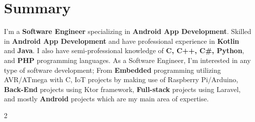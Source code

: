 

\textcolor{darkgray}{\noindent\makebox[\linewidth]{\rule{\maxdimen}{2pt}}}


\section*{\LARGE{Summary}}
I'm a \textbf{Software Engineer} specializing in \textbf{Android App Development}.
Skilled in \textbf{Android App Development} and have professional experience in \textbf{Kotlin} and \textbf{Java}.
I also have semi-professional knowledge of \textbf{C, C++, C\#, Python}, and \textbf{PHP} programming languages.
As a Software Engineer, I'm interested in any type of software development;
From \textbf{Embedded} programming utilizing AVR/ATmega with C, \textbf{}IoT projects by making use of Raspberry Pi/Arduino,
\textbf{Back-End} projects using Ktor framework, \textbf{Full-stack} projects using Laravel, and mostly \textbf{Android} projects which are my main area of expertise.\\
\textcolor{darkgray}{\noindent\makebox[\linewidth]{\rule{\maxdimen}{2pt}}}

\begin{multicols}{2}
    

    
\end{multicols}
\textcolor{darkgray}{\noindent\makebox[\linewidth]{\rule{\maxdimen}{2pt}}}



